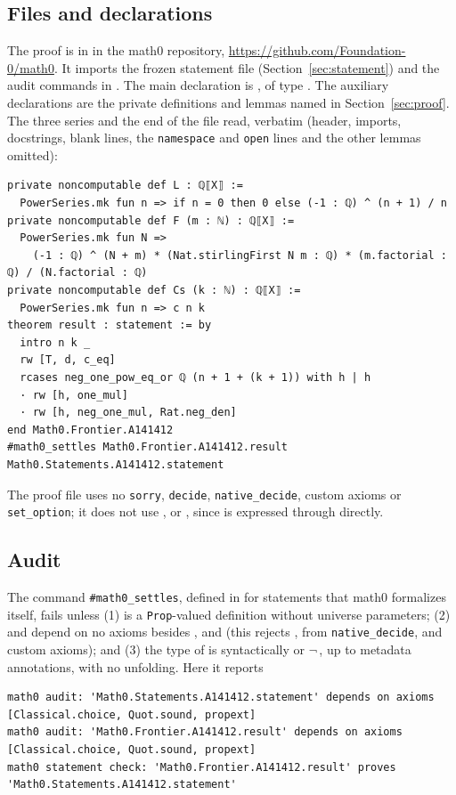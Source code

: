 \documentclass[11pt]{amsart}
\theoremstyle{plain}
\theoremstyle{definition}
\begin{document}
\subsection*{Files and declarations}
The proof is in  in the math0 repository, \url{https://github.com/Foundation-0/math0}. It imports the frozen statement file  (Section~\ref{sec:statement}) and the audit commands in . The main declaration is , of type . The auxiliary declarations are the private definitions and lemmas named in Section~\ref{sec:proof}. The three series and the end of the file read, verbatim (header, imports, docstrings, blank lines, the \texttt{namespace} and \texttt{open} lines and the other lemmas omitted):
\begin{lstlisting}
private noncomputable def L : ℚ⟦X⟧ :=
  PowerSeries.mk fun n => if n = 0 then 0 else (-1 : ℚ) ^ (n + 1) / n
private noncomputable def F (m : ℕ) : ℚ⟦X⟧ :=
  PowerSeries.mk fun N =>
    (-1 : ℚ) ^ (N + m) * (Nat.stirlingFirst N m : ℚ) * (m.factorial : ℚ) / (N.factorial : ℚ)
private noncomputable def Cs (k : ℕ) : ℚ⟦X⟧ :=
  PowerSeries.mk fun n => c n k
theorem result : statement := by
  intro n k _
  rw [T, d, c_eq]
  rcases neg_one_pow_eq_or ℚ (n + 1 + (k + 1)) with h | h
  · rw [h, one_mul]
  · rw [h, neg_one_mul, Rat.neg_den]
end Math0.Frontier.A141412
#math0_settles Math0.Frontier.A141412.result Math0.Statements.A141412.statement
\end{lstlisting}
The proof file uses no \texttt{sorry}, \texttt{decide}, \texttt{native\_decide}, custom axioms or \texttt{set\_option}; it does not use ,  or , since  is expressed through  directly.

\subsection*{Audit}
The command \texttt{\#math0\_settles}, defined in  for statements that math0 formalizes itself, fails unless (1)  is a \texttt{Prop}-valued definition without universe parameters; (2)  and  depend on no axioms besides ,  and  (this rejects ,  from \texttt{native\_decide}, and custom axioms); and (3) the type of  is syntactically  or $\neg$\,, up to metadata annotations, with no unfolding. Here it reports
\begin{lstlisting}[basicstyle=\ttfamily\scriptsize]
math0 audit: 'Math0.Statements.A141412.statement' depends on axioms [Classical.choice, Quot.sound, propext]
math0 audit: 'Math0.Frontier.A141412.result' depends on axioms [Classical.choice, Quot.sound, propext]
math0 statement check: 'Math0.Frontier.A141412.result' proves 'Math0.Statements.A141412.statement'
\end{lstlisting}
\end{document}
